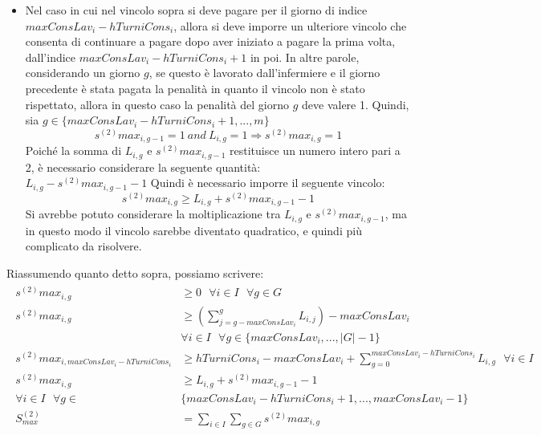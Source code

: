 \begin{itemize}
\item Nel caso in cui nel vincolo sopra si deve pagare per il giorno di indice $maxConsLav_i - hTurniCons_i$, allora si deve imporre un ulteriore vincolo che consenta di continuare a pagare dopo aver iniziato a pagare la prima volta, dall'indice $maxConsLav_i - hTurniCons_i + 1$ in poi.
In altre parole, considerando un giorno $g$, se questo è lavorato dall'infermiere e il giorno precedente è stata pagata la penalità in quanto il vincolo non è stato rispettato, allora in questo caso la penalità del giorno $g$ deve valere 1.
Quindi, sia $g \in \{maxConsLav_i - hTurniCons_i + 1,...,m\}$
\begin{equation}
s^{(2)}max_{i, g-1} = 1~and~L_{i, g} = 1 \Longrightarrow s^{(2)}max_{i, g} = 1
\end{equation}
Poiché la somma di $L_{i, g}$ e $s^{(2)}max_{i, g-1}$ restituisce un numero intero pari a 2, è necessario considerare la seguente quantità:\\
$L_{i, g} - s^{(2)}max_{i, g-1} - 1$
Quindi è necessario imporre il seguente vincolo:
\begin{equation}
s^{(2)}max_{i, g} \geq L_{i, g} + s^{(2)}max_{i, g-1} - 1
\end{equation}
Si avrebbe potuto considerare la moltiplicazione tra $L_{i, g}$ e $s^{(2)}max_{i, g-1}$, ma in questo modo il vincolo sarebbe diventato quadratico, e quindi più complicato da risolvere.
\end{itemize}

Riassumendo quanto detto sopra, possiamo scrivere:
\begin{gather}
\begin{aligned}
s^{(2)}max_{i, g} &\geq 0 ~~~ \forall i \in I ~~~ \forall g \in G \\
s^{(2)}max_{i, g} &\geq (\sum_{j=g - maxConsLav_i}^{g} L_{i, j}) - maxConsLav_i  \\
& \forall i \in I ~~~ \forall g \in \{maxConsLav_i,...,|G| - 1\} \\
s^{(2)}max_{i, maxConsLav_i - hTurniCons_i} &\geq hTurniCons_i - maxConsLav_i + \sum_{g = 0}^{maxConsLav_i - hTurniCons_i} L_{i, g} ~~~ \forall i \in I \\
s^{(2)}max_{i, g} &\geq L_{i, g} + s^{(2)}max_{i, g-1} - 1\\ 
\forall i \in I ~~~ \forall g \in &\{maxConsLav_i - hTurniCons_i + 1,...,maxConsLav_i - 1\} \\
S^{(2)}_{max} &= \sum_{i \in I} \sum_{g \in G} s^{(2)}max_{i, g} \\
\end{aligned}
\end{gather}

